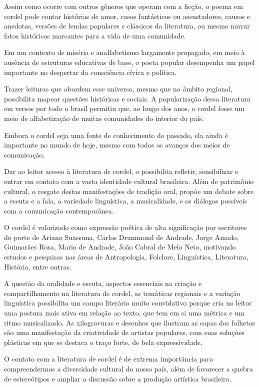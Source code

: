 \documentclass{extarticle}
\begin{document}
Assim como ocorre com outros gêneros que operam com a ficção, o poema em
cordel pode contar histórias de amor, casos fantásticos ou assustadores,
causos e anedotas, versões de lendas populares e clássicos da
literatura, ou mesmo narrar fatos históricos marcantes para a vida de
uma comunidade.

Em um contexto de miséria e analfabetismo largamente propagado, em meio
à ausência de estruturas educativas de base, o poeta popular desempenha
um papel importante no despertar da consciência cívica e política.

Trazer leituras que abordem esse universo, mesmo que no âmbito regional,
possibilita mapear questões históricas e sociais. A popularização dessa
literatura em versos por todo o brasil permitiu que, ao longo dos anos,
o cordel fosse um meio de alfabetização de muitas comunidades do
interior do país.

Embora o cordel seja uma fonte de conhecimento do passado, ela ainda é
importante no mundo de hoje, mesmo com todos os avanços dos meios de
comunicação.

Dar ao leitor acesso à literatura de cordel, o possibilita refletir,
sensibilizar e entrar em contato com a vasta identidade cultural
brasileira. Além de patrimônio cultural, o resgate destas manifestações
de tradição oral, propõe um debate sobre a escuta e a fala, a variedade
linguística, a musicalidade, e os diálogos possíveis com a comunicação
contemporânea.

O cordel é valorizado como expressão poética de alta significação por
escritores do porte de Ariano Suassuna, Carlos Drummond de Andrade,
Jorge Amado, Guimarães Rosa, Mario de Andrade, João Cabral de Melo Neto,
motivando estudos e pesquisas nas áreas de Antropologia, Folclore,
Linguística, Literatura, História, entre outras.

A questão da oralidade e escuta, aspectos essenciais na criação e
compartilhamento na literatura de cordel, as temáticas regionais e a
variação linguística possibilita um campo literário muito convidativo
porque cria no leitor uma postura mais ativa em relação ao texto, que
tem em si uma métrica e um ritmo musicalizado. As xilogravuras e
desenhos que ilustram as capas dos folhetos são uma manifestação da
criatividade de artistas populares, com suas soluções plásticas em que
se destaca o traço forte, de bela expressividade.

O contato com a literatura de cordel é de extrema importância para
compreendermos a diversidade cultural do nosso país, além de favorecer a
quebra de estereótipos e ampliar a discussão sobre a produção artística
brasileira.
\end{document}
